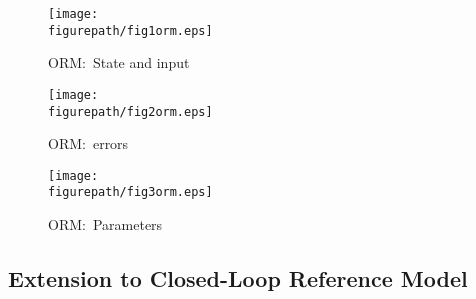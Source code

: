 \begin{figure}[H]
  \begin{center}
    \texttt{[image: \\figurepath/fig1orm.eps]}
    \caption{ORM:\ State and input}
  \end{center}
\end{figure}

\begin{figure}[H]
  \begin{center}
    \texttt{[image: \\figurepath/fig2orm.eps]}
    \caption{ORM:\ errors}
  \end{center}
\end{figure}

\begin{figure}[H]
  \begin{center}
    \texttt{[image: \\figurepath/fig3orm.eps]}
    \caption{ORM:\ Parameters}
  \end{center}
\end{figure}

\subsection{Extension to Closed-Loop Reference Model}

